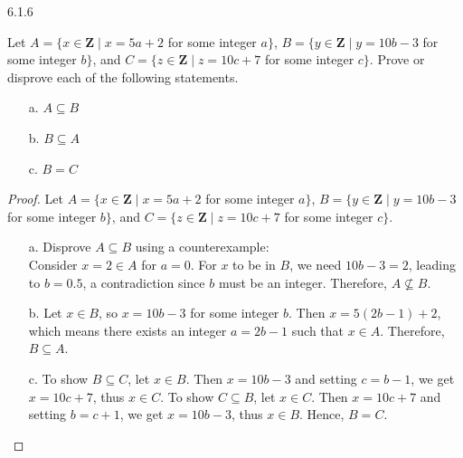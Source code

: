 \begin{question}
    {6.1.6}
    {
        Let $A=\{x \in \mathbf{Z} \mid x=5 a+2$ for some integer $a\}$, $B=\{y \in \mathbf{Z} \mid y=10 b-3$ for some integer $b\}$, and $C=\{z \in \mathbf{Z} \mid z=10 c+7$ for some integer $c\}$. Prove or disprove each of the following statements.
        \vspace{-\baselineskip}
        \begin{enumerate}
            \item[a.] $A \subseteq B$
            \item[b.] $B \subseteq A$
            \item[c.] $B=C$
        \end{enumerate}
    }
\end{question}
\begin{proof}
    Let $A=\{x \in \mathbf{Z} \mid x=5 a+2$ for some integer $a\}$, $B=\{y \in \mathbf{Z} \mid y=10 b-3$ for some integer $b\}$, and $C=\{z \in \mathbf{Z} \mid z=10 c+7$ for some integer $c\}$. 
    \begin{enumerate}
        \item[a.] Disprove $A \subseteq B$ using a counterexample: \\
        Consider $x = 2 \in A$ for $a = 0$. For $x$ to be in $B$, we need $10b - 3 = 2$, leading to $b = 0.5$, a contradiction since $b$ must be an integer. Therefore, $A \not\subseteq B$.
        \item[b.] 
        Let $x \in B$, so $x = 10b - 3$ for some integer $b$. Then $x = 5(2b - 1) + 2$, which means there exists an integer $a = 2b - 1$ such that $x \in A$. Therefore, $B \subseteq A$.
        \item[c.] 
        To show $B \subseteq C$, let $x \in B$. Then $x = 10b - 3$ and setting $c = b - 1$, we get $x = 10c + 7$, thus $x \in C$. To show $C \subseteq B$, let $x \in C$. Then $x = 10c + 7$ and setting $b = c + 1$, we get $x = 10b - 3$, thus $x \in B$. Hence, $B = C$.
    \end{enumerate}
    \vspace{-\baselineskip}
\end{proof}

